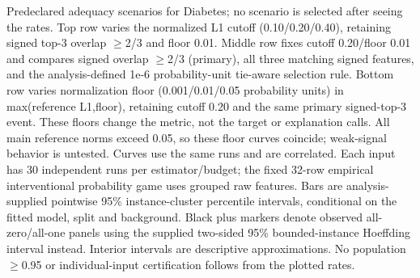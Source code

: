 Predeclared adequacy scenarios for Diabetes; no scenario is selected after seeing the rates. Top row varies the normalized L1 cutoff (0.10/0.20/0.40), retaining signed top-3 overlap $\geq$2/3 and floor 0.01. Middle row fixes cutoff 0.20/floor 0.01 and compares signed overlap $\geq$2/3 (primary), all three matching signed features, and the analysis-defined 1e-6 probability-unit tie-aware selection rule. Bottom row varies normalization floor (0.001/0.01/0.05 probability units) in max(reference L1,floor), retaining cutoff 0.20 and the same primary signed-top-3 event. These floors change the metric, not the target or explanation calls. All main reference norms exceed 0.05, so these floor curves coincide; weak-signal behavior is untested. Curves use the same runs and are correlated. Each input has 30 independent runs per estimator/budget; the fixed 32-row empirical interventional probability game uses grouped raw features. Bars are analysis-supplied pointwise 95\% instance-cluster percentile intervals, conditional on the fitted model, split and background. Black plus markers denote observed all-zero/all-one panels using the supplied two-sided 95\% bounded-instance Hoeffding interval instead. Interior intervals are descriptive approximations. No population $\geq$0.95 or individual-input certification follows from the plotted rates.
